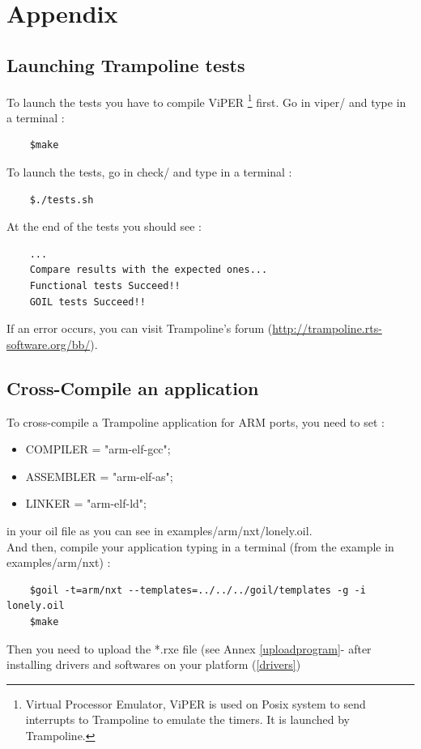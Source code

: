 \newpage
\chapter{Appendix}
\section{Launching Trampoline tests} \label{tests}
To launch the tests you have to compile ViPER \footnote{Virtual Processor Emulator, ViPER is used on Posix system to send interrupts to Trampoline to emulate the timers. It is launched by Trampoline.} first. Go in viper/ and type in a terminal :
	\begin{verbatim}
	$make
	\end{verbatim}
To launch the tests, go in check/ and type in a terminal :
	\begin{verbatim}
	$./tests.sh
	\end{verbatim}
At the end of the tests you should see :
	\begin{verbatim}
	...
	Compare results with the expected ones...
	Functional tests Succeed!!
	GOIL tests Succeed!!
	\end{verbatim}
If an error occurs, you can visit Trampoline's forum (\href{http://trampoline.rts-software.org/bb/}{http://trampoline.rts-software.org/bb/}).


\section{Cross-Compile an application} \label{compileanapplication}
To cross-compile a Trampoline application for ARM ports, you need to set  :
\begin{itemize}
\item COMPILER = "arm-elf-gcc";
\item ASSEMBLER = "arm-elf-as";
\item LINKER = "arm-elf-ld";
\end{itemize}
in your oil file as you can see in examples/arm/nxt/lonely.oil.\\
And then, compile your application typing in a terminal (from the example in examples/arm/nxt) :
	\begin{verbatim}
	$goil -t=arm/nxt --templates=../../../goil/templates -g -i lonely.oil
	$make
	\end{verbatim}
Then you need to upload the *.rxe file (see Annex \ref{uploadprogram}- after installing drivers and softwares on your platform (\ref{drivers})

